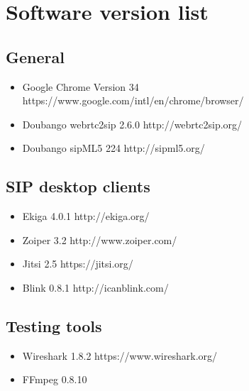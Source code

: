 \chapter{Software version list}

\section{General}
\begin{itemize}
\item Google Chrome Version 34\newline
https://www.google.com/intl/en/chrome/browser/
\item Doubango webrtc2sip 2.6.0\newline
http://webrtc2sip.org/
\item Doubango sipML5 224\newline
http://sipml5.org/
\end{itemize}

\section{SIP desktop clients}
\begin{itemize}
\item Ekiga 4.0.1\newline
http://ekiga.org/
\item Zoiper 3.2\newline
http://www.zoiper.com/
\item Jitsi 2.5\newline
https://jitsi.org/
\item Blink 0.8.1\newline
http://icanblink.com/
\end{itemize}

\section{Testing tools}
\begin{itemize}
\item Wireshark 1.8.2\newline
https://www.wireshark.org/
\item FFmpeg 0.8.10
\end{itemize}